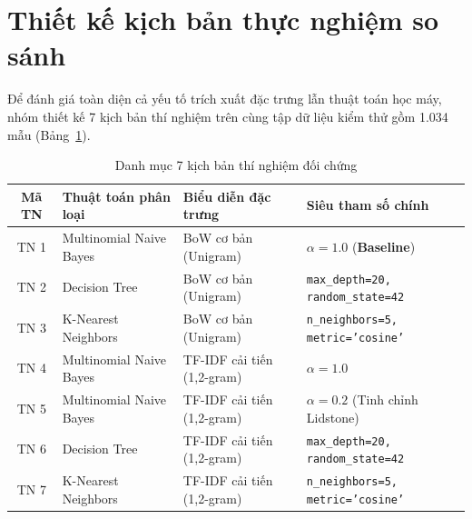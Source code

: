 \documentclass[12pt,a4paper]{report}
\begin{document}
\section{Thiết kế kịch bản thực nghiệm so sánh}
Để đánh giá toàn diện cả yếu tố trích xuất đặc trưng lẫn thuật toán học máy, nhóm thiết kế 7 kịch bản thí nghiệm trên cùng tập dữ liệu kiểm thử gồm 1.034 mẫu (Bảng~\ref{tab:exp_setup}).

\begin{table}[H]
    \centering
    \caption{Danh mục 7 kịch bản thí nghiệm đối chứng}
    \label{tab:exp_setup}
    \begin{tabular}{clll}
        \toprule
        \textbf{Mã TN} & \textbf{Thuật toán phân loại} & \textbf{Biểu diễn đặc trưng} & \textbf{Siêu tham số chính} \\
        \midrule
        TN 1 & Multinomial Naive Bayes & BoW cơ bản (Unigram) & $\alpha = 1.0$ (\textbf{Baseline}) \\
        TN 2 & Decision Tree & BoW cơ bản (Unigram) & \texttt{max\_depth=20, random\_state=42} \\
        TN 3 & K-Nearest Neighbors & BoW cơ bản (Unigram) & \texttt{n\_neighbors=5, metric='cosine'} \\
        TN 4 & Multinomial Naive Bayes & TF-IDF cải tiến (1,2-gram) & $\alpha = 1.0$ \\
        TN 5 & Multinomial Naive Bayes & TF-IDF cải tiến (1,2-gram) & $\alpha = 0.2$ (Tinh chỉnh Lidstone) \\
        TN 6 & Decision Tree & TF-IDF cải tiến (1,2-gram) & \texttt{max\_depth=20, random\_state=42} \\
        TN 7 & K-Nearest Neighbors & TF-IDF cải tiến (1,2-gram) & \texttt{n\_neighbors=5, metric='cosine'} \\
        \bottomrule
    \end{tabular}
\end{table}
\end{document}
